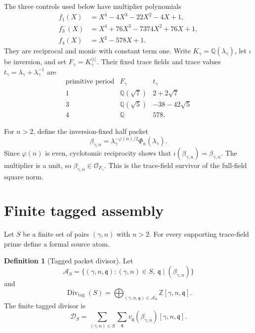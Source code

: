 \documentclass[11pt]{article}
\theoremstyle{definition}\newtheorem{definition}[theorem]{Definition}
\theoremstyle{remark}\newtheorem{remark}[theorem]{Remark}
\DeclareMathOperator{\Div}{Div}
\begin{document}
The three controls used below have multiplier polynomials
\begin{align}
f_1(X)&=X^4-4X^3-22X^2-4X+1,\label{eq:f1}\\
f_3^-(X)&=X^4+76X^3-7374X^2+76X+1,\label{eq:f3}\\
f_4(X)&=X^2-578X+1.\label{eq:f4}
\end{align}
They are reciprocal and monic with constant term one.  Write
$K_\gamma=\mathbb Q(\lambda_\gamma)$, let $\iota$ be inversion, and set
$F_\gamma=K_\gamma^{\langle\iota\rangle}$.  Their fixed trace fields and
trace values $t_\gamma=\lambda_\gamma+\lambda_\gamma^{-1}$ are
\[
\begin{array}{c|c|c}
\text{primitive period}&F_\gamma&t_\gamma\\\hline
1&\mathbb Q(\sqrt7)&2+2\sqrt7\\
3&\mathbb Q(\sqrt5)&-38-42\sqrt5\\
4&\mathbb Q&578.
\end{array}
\]

For $n>2$, define the inversion-fixed half packet
\begin{equation}\label{eq:beta}
\beta_{\gamma,n}
=\lambda_\gamma^{-\varphi(n)/2}\Phi_n(\lambda_\gamma).
\end{equation}
Since $\varphi(n)$ is even, cyclotomic reciprocity shows that
$\iota(\beta_{\gamma,n})=\beta_{\gamma,n}$.  The multiplier is a unit, so
$\beta_{\gamma,n}\in\mathcal O_{F_\gamma}$.  This is the trace-field
survivor of the full-field square norm.

\section{Finite tagged assembly}

Let $S$ be a finite set of pairs $(\gamma,n)$ with $n>2$.  For every
supporting trace-field prime define a formal source atom.

\begin{definition}[Tagged packet divisor]
Let
\[
\mathcal A_S=\{(\gamma,n,\mathfrak q):
(\gamma,n)\in S,\ \mathfrak q\mid(\beta_{\gamma,n})\}
\]
and
\[
\Div_{\mathrm{tag}}(S)
=\bigoplus_{(\gamma,n,\mathfrak q)\in\mathcal A_S}
\mathbb Z[\gamma,n,\mathfrak q].
\]
The finite tagged divisor is
\begin{equation}\label{eq:tagdiv}
\mathscr D_S=\sum_{(\gamma,n)\in S}
\sum_{\mathfrak q}v_{\mathfrak q}(\beta_{\gamma,n})
[\gamma,n,\mathfrak q].
\end{equation}
\end{definition}
\end{document}
